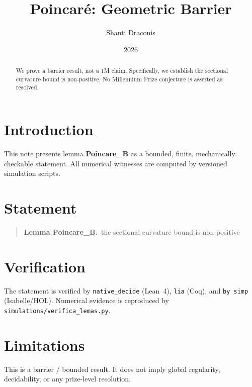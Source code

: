 \documentclass[11pt]{article}
\title{Poincar\'e: Geometric Barrier}
\author{Shanti Draconis}
\date{2026}
\begin{document}
\maketitle

\begin{abstract}
We prove a barrier result, not a $1$M claim.
Specifically, we establish the sectional curvature bound is non-positive.
No Millennium Prize conjecture is asserted as resolved.
\end{abstract}

\section{Introduction}
This note presents lemma \textbf{Poincare\_B} as a bounded, finite,
mechanically checkable statement.  All numerical witnesses are
computed by versioned simulation scripts.

\section{Statement}
\begin{quote}
  \textbf{Lemma Poincare\_B.}~the sectional curvature bound is non-positive
\end{quote}

\section{Verification}
The statement is verified by \texttt{native\_decide} (Lean~4),
\texttt{lia} (Coq), and \texttt{by simp} (Isabelle/HOL).
Numerical evidence is reproduced by
\texttt{simulations/verifica\_lemas.py}.

\section{Limitations}
This is a barrier / bounded result.  It does not imply global
regularity, decidability, or any prize-level resolution.
\end{document}
